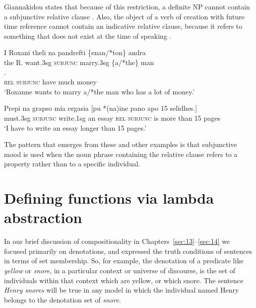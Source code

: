 Giannakidou states that because of this restriction, a definite NP cannot contain a subjunctive relative clause . Also, the object of a verb of creation with future time reference cannot contain an indicative relative clause, because it refers to something that does not exist at the time of speaking .


\ea \label{ex:15.34} 
\ea \label{ex:15.} \gll I  Roxani  theli  na  pandrefti  \{enan/*ton\}  andra\\
the  R.  want.3sg  \textsc{subjunc}  marry.3sg  \{a/*the\}  man\\
\ex \gll{}.\\
 \textsc{rel}  \textsc{subjunc}  have  much  money\\
\glt ‘Roxanne wants to marry a/*the man who has a lot of money.’\\
\z \z

\ea \label{ex:15.35}
\gll Prepi  na  grapso  mia  ergasia  [pu  *(na)\footnotemark  ine  pano  apo  15  selidhes.]\\
must.3sg  \textsc{subjunc}  write.1sg  an  essay  \textsc{rel}  \textsc{subjunc}  is  more  than  15  pages\\
\glt ‘I have to write an essay longer than 15 pages.’\\
\z
{}

The pattern that emerges from these and other examples is that subjunctive mood is used when the noun phrase containing the relative clause refers to a property rather than to a specific individual.


\section{Defining functions via lambda abstraction}\label{sec:15.6}

In our brief discussion of compositionality in Chapters~\ref{sec:13}--\ref{sec:14} we focused primarily on denotations, and expressed the truth conditions of sentences in terms of set membership. So, for example, the denotation of a predicate like \textit{yellow} or \textit{snore}, in a particular context or universe of discourse, is the set of individuals within that context which are yellow, or which snore. The sentence \textit{Henry snores} will be true in any model in which the individual named Henry belongs to the denotation set of \textit{snore}.



